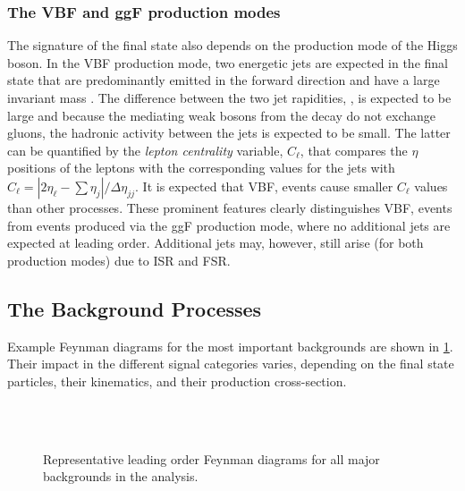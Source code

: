 \subsubsection{The VBF and ggF production modes}
The signature of the final state also depends on the production mode of the Higgs boson.
In the VBF production mode, two energetic jets are expected in the final state that are predominantly emitted in the forward direction and have a large invariant mass \mjj. 
The difference between the two jet rapidities, \dyjj, is expected to be large and because the mediating weak bosons from the \HWW decay do not exchange gluons, the hadronic activity between the jets is expected to be small. 
The latter can be quantified by the \emph{lepton centrality} variable, $C_\ell$, that compares the $\eta$ positions of the leptons with the corresponding values for the jets with $C_\ell = |2\eta_\ell - \sum \eta_j| / \Delta \eta_{jj}$. It is expected that VBF, \HWW events cause smaller $C_\ell$ values than other processes.
These prominent features clearly distinguishes VBF, \HWW events from events produced via the ggF production mode, where no additional jets are expected at leading order. Additional jets may, however, still arise (for both production modes) due to ISR and FSR. 

\subsection{The Background Processes}
Example Feynman diagrams for the most important backgrounds are shown in \cref{fig:hww:feyn-bkgs}.
Their impact in the different signal categories varies, depending on the final state particles, their kinematics, and their production cross-section. 
\begin{figure}[ht]
     \hspace{5em}
     \\
     \hspace{5em}
     \\
     \hspace{5em}
    \caption{Representative leading order Feynman diagrams for all major backgrounds in the \HWW analysis.} 
    \label{fig:hww:feyn-bkgs}
\end{figure}

